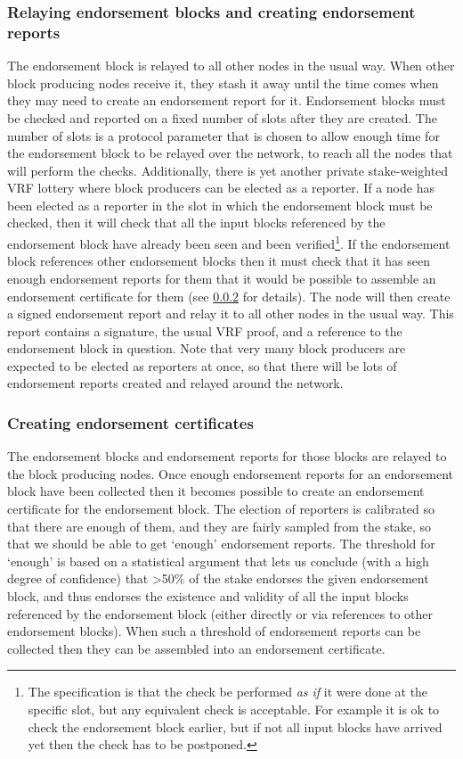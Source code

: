 \documentclass[11pt,a4paper]{article}
\begin{document}
\subsubsection{Relaying endorsement blocks and creating endorsement reports}
The endorsement block is relayed to all other nodes in the usual way. When other
block producing nodes receive it, they stash it away until the time comes when
they may need to create an endorsement report for it. Endorsement blocks must
be checked and reported on a fixed number of slots after they are created. The
number of slots is a protocol parameter that is chosen to allow enough time for
the endorsement block to be relayed over the network, to reach all the nodes
that will perform the checks. Additionally, there is yet another private
stake-weighted VRF lottery where block producers can be elected as a reporter.
If a node has been elected as a reporter in the slot in which the endorsement
block must be checked, then it will check that all the input blocks referenced
by the endorsement block have already been seen and been verified\footnote{The
specification is that the check be performed \emph{as if} it were done at the
specific slot, but any equivalent check is acceptable. For example it is ok to
check the endorsement block earlier, but if not all input blocks have arrived
yet then the check has to be postponed.}. If the endorsement block references
other endorsement blocks then it must check that it has seen enough endorsement
reports for them that it would be possible to assemble an endorsement
certificate for them (see \cref{creating-endorsement-certificates} for details).
The node will then create a signed endorsement report and relay it to all other
nodes in the usual way. This report contains a signature, the usual VRF proof,
and a reference to the endorsement block in question. Note that very many block
producers are expected to be elected as reporters at once, so that there will
be lots of endorsement reports created and relayed around the network.

\subsubsection{Creating endorsement certificates}
\label{creating-endorsement-certificates}
The endorsement blocks and endorsement reports for those blocks are relayed
to the block producing nodes. Once enough endorsement reports for an
endorsement block have been collected then it becomes possible to create an
endorsement certificate for the endorsement block. The election of reporters is
calibrated so that there are enough of them, and they are fairly sampled from
the stake, so that we should be able to get `enough' endorsement reports. The
threshold for `enough' is based on a statistical argument that lets us conclude
(with a high degree of confidence) that \textgreater{}50\% of the stake
endorses the given endorsement block, and thus endorses the existence and
validity of all the input blocks referenced by the endorsement block (either
directly or via references to other endorsement blocks). When such a threshold
of endorsement reports can be collected then they can be assembled into an
endorsement certificate.
\end{document}
